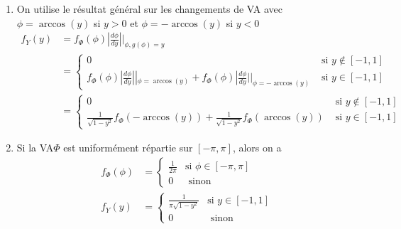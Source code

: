 \documentclass[main.tex]{subfiles}
\begin{document}
\begin{enumerate}
\item On utilise le résultat général sur les changements de VA avec $\phi = \arccos(y)$ si $y>0$ et $\phi = -\arccos(y)$ si $y<0$
\begin{align*}
f_Y(y) & = f_{\Phi}(\phi) |\frac{d\phi}{dy}||_{\phi,g(\phi)=y} \\
& = \left\{
\begin{array}{ll}
0 & \text{ si } y \notin [-1,1] \\
f_{\Phi}(\phi) |\frac{d\phi}{dy}||_{\phi=\arccos(y)} + f_{\Phi}(\phi) |\frac{d\phi}{dy}||_{\phi=-\arccos(y)}& \text{ si } y\in[-1,1]
\end{array}
\right. \\
& = \left\{
\begin{array}{ll}
0 & \text{ si } y \notin [-1,1] \\
\frac{1}{\sqrt{1-y^2}}f_{\Phi}(-\arccos(y)) + \frac{1}{\sqrt{1-y^2}}f_{\Phi}(\arccos(y))&  \text{ si } y\in[-1,1]
\end{array}
\right.
\end{align*} 

\item Si  la VA$\Phi$ est uniformément répartie sur $[-\pi,\pi]$, alors on a 
\begin{align*}
f_{\Phi}(\phi) & = 
\left\{
\begin{array}{ll}
\frac{1}{2\pi} & \text{si } \phi \in [-\pi,\pi] \\
0 & \text{ sinon }
\end{array}
\right. \\
f_Y(y) & = 
\left\{
\begin{array}{ll}
\frac{1}{\pi\sqrt{1-y^2}} & \text{si } y \in [-1,1] \\
0 & \text{ sinon }
\end{array}
\right. \\
\end{align*}
\end{enumerate}
\end{document}
